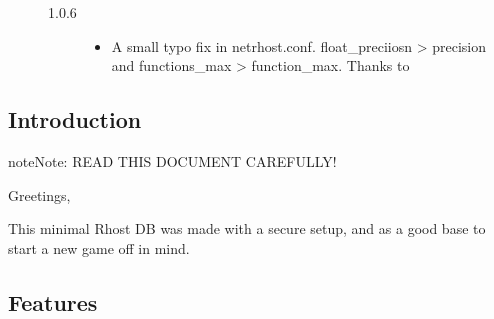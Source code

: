 \documentclass[letterpaper,10pt,english]{sphinxmanual}
\begin{document}
\begin{description}
\begin{description}
\begin{itemize}
\end{itemize}

\item[{1.0.6}] \leavevmode\begin{itemize}
\item {} 
\sphinxAtStartPar
A small typo fix in netrhost.conf. float\_preciiosn \sphinxhyphen{}\textgreater{} precision and
functions\_max \sphinxhyphen{}\textgreater{} function\_max. Thanks to 

\end{itemize}

\end{description}

\end{description}


\subsection{Introduction}
\label{\detokenize{gettingstarted:introduction}}
\begin{sphinxadmonition}{note}{Note:}
\sphinxAtStartPar
READ THIS DOCUMENT CAREFULLY!
\end{sphinxadmonition}

\sphinxAtStartPar
Greetings,

\sphinxAtStartPar
This minimal Rhost DB was made with a secure setup, and as a good base to start
a new game off in mind.


\subsection{Features}
\label{\detokenize{gettingstarted:features}}
\end{document}
